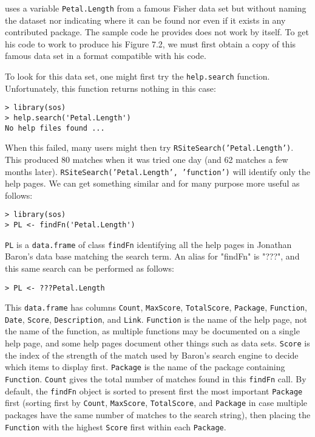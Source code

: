 \cite[pp. 282-283]{JC09} uses a variable {\tt Petal.Length} from a
famous Fisher data set but without naming the dataset nor indicating
where it can be found nor even if it exists in any contributed \R{}
package.  The sample code he provides does not work by itself.  To get
his code to  work to produce his Figure 7.2, we must first obtain a
copy of this famous data set in a format compatible with his code.

To look for this data set, one might first try
the {\tt help.search} function.  Unfortunately, this function
returns nothing in this case:
\begin{verbatim}
> library(sos)
> help.search('Petal.Length')
No help files found ...
\end{verbatim}
When this failed, many users might then try
{\tt RSiteSearch('Petal.Length')}.  This produced 80 matches
when it was tried one day (and 62 matches a few months later).
{\tt RSiteSearch('Petal.Length', 'function')} will identify
only the help pages.  We can get something similar and for
many purpose more useful as follows:
\begin{verbatim}
> library(sos)
> PL <- findFn('Petal.Length')
\end{verbatim}
{\tt PL} is a {\tt data.frame} of class {\tt findFn} identifying
all the help pages in Jonathan Baron's data base matching the
search term.  An alias for "findFn" is "???", and this same 
search can be performed as follows:  
\begin{verbatim}
> PL <- ???Petal.Length
\end{verbatim}
This {\tt data.frame} has columns {\tt Count},
{\tt MaxScore}, {\tt TotalScore}, {\tt Package}, {\tt Function},
{\tt Date}, {\tt Score}, {\tt Description}, and {\tt Link}.
{\tt Function} is the name of the help page, not the name of the
function, as multiple functions may be documented on a single
help page, and some help pages document other things such as data
sets.  {\tt Score} is the index of the strength of the match used
by Baron's search engine to decide which items to display first.
{\tt Package} is the name of the package containing {\tt Function}.
{\tt Count} gives the total number of matches found in this
{\tt findFn} call.  By default, the {\tt findFn} object is sorted
to present first the most important {\tt Package} first (sorting first
by {\tt Count}, {\tt MaxScore},  {\tt TotalScore}, and {\tt Package}
in case multiple packages have the same number of matches to the
search string), then placing the {\tt Function} with the highest
{\tt Score} first within each {\tt Package}.

